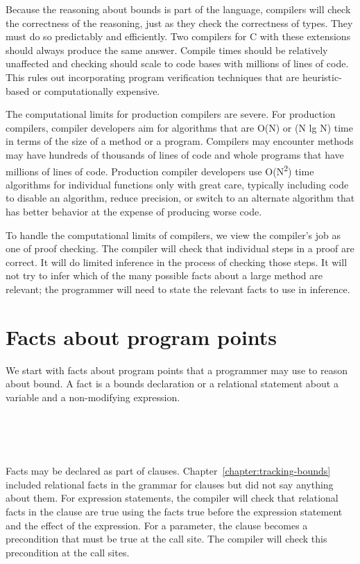 Because the reasoning about bounds is part of the language, compilers
will check the correctness of the reasoning, just as they check the
correctness of types. They must do so predictably and efficiently. Two
compilers for C with these extensions should always produce the same
answer. Compile times should be relatively unaffected and checking
should scale to code bases with millions of lines of code. This rules
out incorporating program verification techniques that are
heuristic-based or computationally expensive.

The computational limits for production compilers are severe. For
production compilers, compiler developers aim for algorithms that are
O(N) or (N lg N) time in terms of the size of a method or a program.
Compilers may encounter methods may have hundreds of thousands of lines
of code and whole programs that have millions of lines of code.
Production compiler developers use O(N\textsuperscript{2}) time
algorithms for individual functions only with great care, typically
including code to disable an algorithm, reduce precision, or switch to
an alternate algorithm that has better behavior at the expense of
producing worse code.

To handle the computational limits of compilers, we view the compiler's
job as one of proof checking. The compiler will check that individual
steps in a proof are correct. It will do limited inference in the
process of checking those steps. It will not try to infer which of the
many possible facts about a large method are relevant; the programmer
will need to state the relevant facts to use in inference.

\section{Facts about program points}

We start with facts about program points that a programmer may use to
reason about bound.  A  fact is a bounds declaration or a relational
statement about a variable and a non-modifying expression.
\begin{tabbing}
\=\\
\> \\
\> \\
\>
\end{tabbing}

Facts may be declared as part of  clauses.  
Chapter~\ref{chapter:tracking-bounds} included relational facts in
the grammar for  clauses but did not say
anything about them.  For expression statements, the compiler
will check that relational facts in the  clause are true 
using the facts true before the expression statement and the effect of
the expression. For a parameter, the  clause becomes a 
precondition that must be true at the call site. The compiler will check this precondition at the call sites. 

